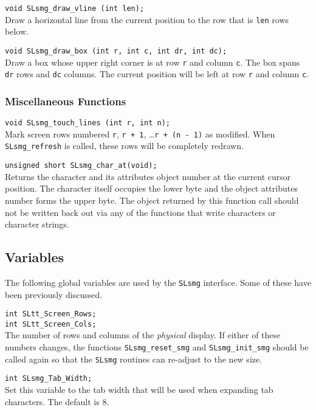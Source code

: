   \verb|void SLsmg_draw_vline (int len);|\\
  Draw a horizontal line from the current position to the row that is
  \verb|len| rows below.
  
  \verb|void SLsmg_draw_box (int r, int c, int dr, int dc);|\\
  Draw a box whose upper right corner is at row \verb|r| and column \verb|c|.
  The box spans \verb|dr| rows and \verb|dc| columns.  The current position
  will be left at row \verb|r| and column \verb|c|.
  
\subsubsection{Miscellaneous Functions}
 
  \verb|void SLsmg_touch_lines (int r, int n);|\\
  Mark screen rows numbered \verb|r|, \verb|r + 1|, \ldots \verb|r + (n - 1)| as
  modified.  When \verb|SLsmg_refresh| is called, these rows will be
  completely redrawn.
  
  \verb|unsigned short SLsmg_char_at(void);|\\
  Returns the character and its attributes object number at the current
  cursor position.  The character itself occupies the lower byte and the
  object attributes number forms the upper byte.  The object returned
  by this function call should not be written back out via any of the
  functions that write characters or character strings.
  
\subsection{Variables}

  The following \slang{} global variables are used by the \verb|SLsmg|
  interface.  Some of these have been previously discussed.
  
  \verb|int SLtt_Screen_Rows;|\\
  \verb|int SLtt_Screen_Cols;|\\
  The number of rows and columns of the {\em physical} display.  If either of
  these numbers changes, the functions \verb|SLsmg_reset_smg| and
  \verb|SLsmg_init_smg| should be called again so that the \verb|SLsmg|
  routines can re-adjust to the new size.
  
  \verb|int SLsmg_Tab_Width;|\\
  Set this variable to the tab width that will be used when expanding tab
  characters.  The default is 8.
  
